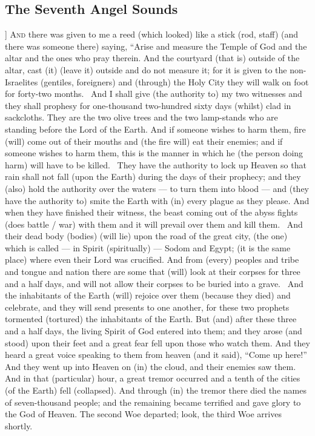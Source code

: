 \begin{pages}
\begin{Leftside}
        			\chapter{The Seventh Angel Sounds}
				]		
		\renewcommand{\LettrineFontHook}{\Zallmanfamily}
		\lettrine[lines=3]{A}{nd} there was given to me a reed (which looked) like a stick (rod, staff) (and there was someone there) saying, “Arise and measure the Temple of God and the altar and the ones who pray therein. And the courtyard (that is) outside of the altar, cast (it) (leave it) outside and do not measure it; for it is given to the non-Israelites (gentiles, foreigners) and (through) the Holy City they will walk on foot for forty-two months. 
		\pend
		\pstart
		And I shall give (the authority to) my two witnesses and they shall prophesy for one-thousand two-hundred sixty days (whilst) clad in sackcloths. They are the two olive trees and the two lamp-stands who are standing before the Lord of the Earth. And if someone wishes to harm them, fire (will) come out of their mouths and (the fire will) eat their enemies; and if someone wishes to harm them, this is the manner in which he (the person doing harm) will have to be killed. 	
		\pend
		\pstart
		They have the authority to lock up Heaven so that rain shall not fall (upon the Earth) during the days of their prophecy; and they (also) hold the authority over the waters — to turn them into blood — and (they have the authority to) smite the Earth with (in) every plague as they please. And when they have finished their witness, the beast coming out of the abyss fights (does battle / war) with them and it will prevail over them and kill them. 
		\pend
		\pstart
		And their dead body (bodies) (will lie) upon the road of the great city, (the one) which is called — in Spirit (spiritually) — Sodom and Egypt; (it is the same place) where even their Lord was crucified. And from (every) peoples and tribe and tongue and nation there are some that (will) look at their corpses for three and a half days, and will not allow their corpses to be buried into a grave. 
		\pend
		\pstart
		And the inhabitants of the Earth (will) rejoice over them (because they died) and celebrate, and they will send presents to one another, for these two prophets tormented (tortured) the inhabitants of the Earth. But (and) after these three and a half days, the living Spirit of God entered into them; and they arose (and stood) upon their feet and a great fear fell upon those who watch them. 
		\pend
		\pstart
		And they heard a great voice speaking to them from heaven (and it said), “Come up here!” And they went up into Heaven on (in) the cloud, and their enemies saw them. And in that (particular) hour, a great tremor occurred and a tenth of the cities (of the Earth) fell (collapsed). And through (in) the tremor there died the names of seven-thousand people; and the remaining became terrified and gave glory to the God of Heaven. The second Woe departed; look, the third Woe arrives shortly. 

\end{Leftside}
\end{pages}
